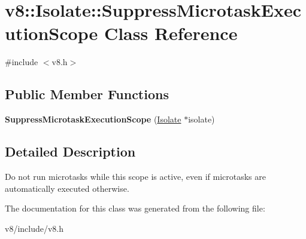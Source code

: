 \hypertarget{classv8_1_1Isolate_1_1SuppressMicrotaskExecutionScope}{}\section{v8\+:\+:Isolate\+:\+:Suppress\+Microtask\+Execution\+Scope Class Reference}
\label{classv8_1_1Isolate_1_1SuppressMicrotaskExecutionScope}


{\ttfamily \#include $<$v8.\+h$>$}

\subsection*{Public Member Functions}
\begin{DoxyCompactItemize}
\item 
\hypertarget{classv8_1_1Isolate_1_1SuppressMicrotaskExecutionScope_a846d7dd39f4cfad4dfc4c8c785e4a65e}{}{\bfseries Suppress\+Microtask\+Execution\+Scope} (\hyperlink{classv8_1_1Isolate}{Isolate} $\ast$isolate)\label{classv8_1_1Isolate_1_1SuppressMicrotaskExecutionScope_a846d7dd39f4cfad4dfc4c8c785e4a65e}

\end{DoxyCompactItemize}


\subsection{Detailed Description}
Do not run microtasks while this scope is active, even if microtasks are automatically executed otherwise. 

The documentation for this class was generated from the following file\+:\begin{DoxyCompactItemize}
\item 
v8/include/v8.\+h\end{DoxyCompactItemize}
